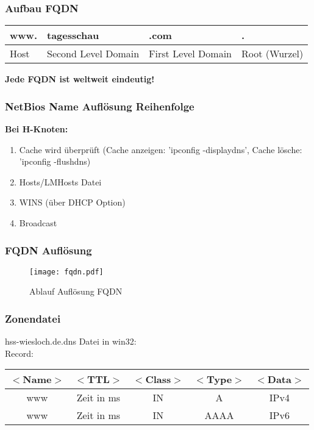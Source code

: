 \documentclass[asp1.tex]{subfiles}
\begin{document}
\subsubsection{Aufbau FQDN}

\begin{table}[H]
    \centering
    \begin{tabular}{|l|l|l|l|}
         \hline
         www.&tagesschau&.com&.\\\hline
         Host&Second Level Domain& First Level Domain & Root (Wurzel)\\\hline
    \end{tabular}
\end{table}

\textbf{Jede FQDN ist weltweit eindeutig!}

\subsubsection{NetBios Name Auflösung Reihenfolge}
\textbf{Bei H-Knoten:}
\begin{enumerate}
        \item Cache wird überprüft (Cache anzeigen: 'ipconfig -displaydns', Cache lösche: 'ipconfig -flushdns)
	\item Hosts/LMHosts Datei
	\item WINS (über DHCP Option)
        \item Broadcast
\end{enumerate}

\subsubsection{FQDN Auflösung}

\begin{figure}[H]
	\texttt{[image: fqdn.pdf]}
	\caption{Ablauf Auflösung FQDN}
\end{figure}


\subsubsection{Zonendatei}

hss-wiesloch.de.dns Datei in win32:\\
Record:

\begin{tabular}{|c|c|c|c|c|}
\hline
    \(<\)Name\(>\)&\(<\)TTL\(>\)&\(<\)Class\(>\)&\(<\)Type\(>\)&\(<\)Data\(>\)\\\hline
    www&Zeit in ms&IN&A&IPv4\\\hline
    www&Zeit in ms&IN&AAAA&IPv6\\\hline
\end{tabular}
\end{document}
